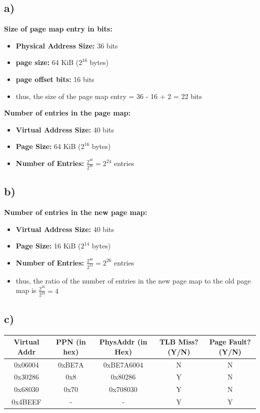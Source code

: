 \documentclass[cn,12pt]{homework}
\begin{document}
\begin{solution}

  \subsection*{a)}
\textbf{Size of page map entry in bits:}
\begin{itemize}
  \item \textbf{Physical Address Size:} 36 bits
  \item \textbf{page size:} 64 KiB ($2^{16}$ bytes)
  \item \textbf{page offset bits:} 16 bits
  \item thus, the size of the page map entry = 36 - 16 + 2 = 22 bits
\end{itemize}

\textbf{Number of entries in the page map:}
\begin{itemize}
  \item \textbf{Virtual Address Size:} 40 bits
  \item \textbf{Page Size:} 64 KiB ($2^{16}$ bytes)
  \item \textbf{Number of Entries:} $\frac{2^{40}}{2^{16}} = 2^{24}$ entries
\end{itemize}

  \subsection*{b)}
\textbf{Number of entries in the new page map:}
\begin{itemize}
  \item \textbf{Virtual Address Size:} 40 bits
  \item \textbf{Page Size:} 16 KiB ($2^{14}$ bytes)
  \item \textbf{Number of Entries:} $\frac{2^{40}}{2^{14}} = 2^{26}$ entries
  \item thus, the ratio of the number of entries in the new page map to the old page map is $\frac{2^{26}}{2^{24}} = 4$
\end{itemize}

  \subsection*{c)}

\begin{tabular}{|c|c|c|c|c|}
\hline
\textbf{Virtual Addr} & \textbf{PPN (in hex)} & \textbf{PhysAddr (in Hex)} & \textbf{TLB Miss? (Y/N)} & \textbf{Page Fault? (Y/N)} \\
\hline
0x06004 & 0xBE7A & 0xBE7A6004  & N & N \\
0x30286 & 0x8 & 0x80286 & Y & N \\
0x68030 & 0x70 & 0x708030 & Y & N \\
0x4BEEF & - & - & Y & Y \\
\hline
\end{tabular}


\end{solution}
\newpage
\end{document}
